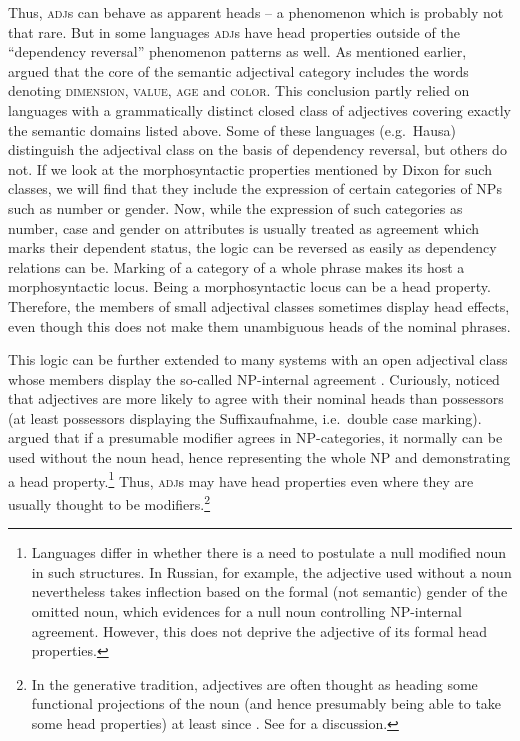 \documentclass[output=paper
  ,nobabel
  ,draftmode
  ,colorlinks, citecolor=brown
]{langscibook}
\begin{document}
\noindent
Thus, \textsc{adj}s can behave as apparent heads – a phenomenon which is probably not that rare. But in some languages \textsc{adj}s have head properties outside of the ``dependency reversal'' phenomenon patterns as well. As mentioned earlier, \citet{Dixon1979} argued that the core of the semantic adjectival category includes the words denoting \textsc{dimension}, \textsc{value}, \textsc{age} and \textsc{color}. This conclusion partly relied on languages with a grammatically distinct closed class of adjectives covering exactly the semantic domains listed above. Some of these languages (e.g.\ Hausa) distinguish the adjectival class on the basis of dependency reversal, but others do not. If we look at the morphosyntactic properties mentioned by Dixon for such classes, we will find that they include the expression of certain categories of NPs such as number or gender. Now, while the expression of such categories as number, case and gender on attributes is usually treated as agreement which marks their dependent status, the logic can be reversed as easily as dependency relations can be. Marking of a category of a whole phrase makes its host a morphosyntactic locus. Being a morphosyntactic locus can be a head property. Therefore, the members of small adjectival classes sometimes display head effects, even though this does not make them unambiguous heads of the nominal phrases.

\largerpage[-1]
This logic can be further extended to many systems with an open adjectival class whose members display the so-called NP-internal agreement \citep[cf.][21--23 for Russian]{Corbett93a}. Curiously, \citet{Moravcsik1995} noticed that adjectives are more likely to agree with their nominal heads than possessors (at least possessors displaying the Suffixaufnahme, i.e.\ double case marking). \citet{Lander2010} argued that if a presumable modifier agrees in NP-categories, it normally can be used without the noun head, hence representing the whole NP and demonstrating a head property.\footnote{Languages differ in whether there is a need to postulate a null modified noun in such structures. In Russian, for example, the adjective used without a noun nevertheless takes inflection based on the formal (not semantic) gender of the omitted noun, which evidences for a null noun controlling NP-internal agreement. However, this does not deprive the adjective of its formal head properties.}
Thus, \textsc{adj}s may have head properties even where they are usually thought to be modifiers.\footnote{In the generative tradition, adjectives are often thought as heading some functional projections of the noun (and hence presumably being able to take some head properties) at least since \citet{Abney87a}. See \citet{Cinque2010} for a  discussion.} 
\end{document}
